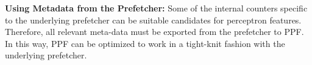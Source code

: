 \noindent \textbf{Using Metadata from the Prefetcher:} Some of the 
internal counters specific to the underlying prefetcher can be suitable candidates
for perceptron features. Therefore, all relevant meta-data must be exported from 
the prefetcher to PPF. In this way, PPF can be optimized to work in a tight-knit fashion
with the {\color{red}underlying} prefetcher.


